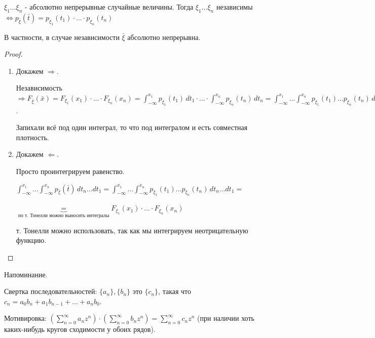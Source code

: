 \begin{consequence}
    $\xi_1 \ldots \xi_n$ - абсолютно непрерывные случайные величины. Тогда
    $\xi_1 \ldots \xi_n$ независимы $\Longleftrightarrow p_{\bar{\xi}} (\bar{t}) = p_{\xi_1} (t_1) \cdot \ldots \cdot p_{\xi_n}(t_n)$

    В частности, в случае независимости $\bar{\xi}$ абсолютно непрерывна.
\end{consequence}

\begin{proof}
    \begin{enumerate}
        \item {
            Докажем $\Rightarrow$.

            Независимость $\Rightarrow F_{\bar{\xi}} (\bar{x}) = F_{\xi_1} (x_1) \cdot \ldots \cdot F_{\xi_n} (x_n) =
            \int_{-\infty}^{x_1} p_{\xi_1} (t_1) \, dt_1 \cdot \ldots \cdot \int_{-\infty}^{x_n} p_{\xi_n} (t_n) \, dt_n =
            \int_{-\infty}^{x_1} \ldots \int_{-\infty}^{x_n} p_{\xi_1} (t_1) \ldots p_{\xi_n} (t_n) \, dt_n \ldots dt_1$.

            Запихали всё под один интеграл, то что под интегралом и есть совместная плотность.
        }
        \item {
            Докажем $\Leftarrow$.

            Просто проинтегрируем равенство.

            $\int_{-\infty}^{x_1} \ldots \int_{-\infty}^{x_n} p_{\bar{\xi}} (\bar{t}) \, dt_n \ldots dt_1 =
            \int_{-\infty}^{x_1} \ldots \int_{-\infty}^{x_n} p_{\xi_1} (t_1) \ldots p_{\xi_n} (t_n) \, dt_n \ldots dt_1 =$

            $\underbrace{=}_{\text{по т. Тонелли можно выносить интегралы}} F_{\xi_1} (x_1) \cdot \ldots \cdot F_{\xi_n} (x_n)$

            т. Тонелли можно использовать, так как мы интегрируем неотрицательную функцию.
        }
    \end{enumerate}
\end{proof}

\begin{remark}
    Напоминание.

    Свертка последовательностей: $\{a_n\}, \{b_n\}$ это $\{c_n\}$, такая что $c_n = a_0 b_n + a_1 b_{n - 1} + \ldots + a_n b_0$.

    Мотивировка: $\left(\sum_{n=0}^{\infty}a_n z^n\right) \cdot \left(\sum_{n = 0}^{\infty} b_n z^n\right) = \sum_{n=0}^{\infty} c_n z^n$  (при наличии хоть каких-нибудь кругов сходимости у обоих рядов).
\end{remark}

